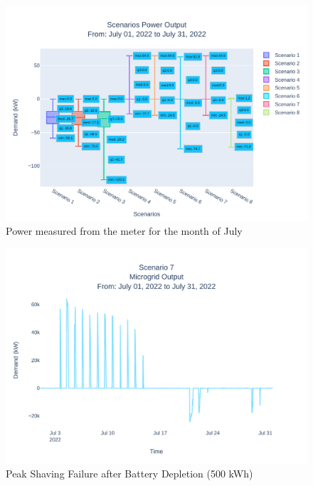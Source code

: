\documentclass[conference]{IEEEtran}
\begin{document}
	\begin{figure}
		\centering
		\includegraphics[width=0.9\linewidth]{Fig/Option_3/4_Scn_Output_Run_3_Jul_01_2022_to_Jul_31_2022}
		\caption{\footnotesize  Power measured from the meter for the month of July}
		\label{fig:4scnoutputrun2jul012022tojul312022}
	\end{figure}
	\begin{figure}
	\centering
	\includegraphics[width=0.9\linewidth]{Fig/Option_3/4_Scenario_7_Run_3_Mg_Output_Jul_01_2022_to_Jul_31_2022.pdf}
	\caption{\footnotesize Peak Shaving Failure after Battery Depletion (500 kWh)}
	\label{fig:scenario3peakshaving}
\end{figure}
\end{document}
